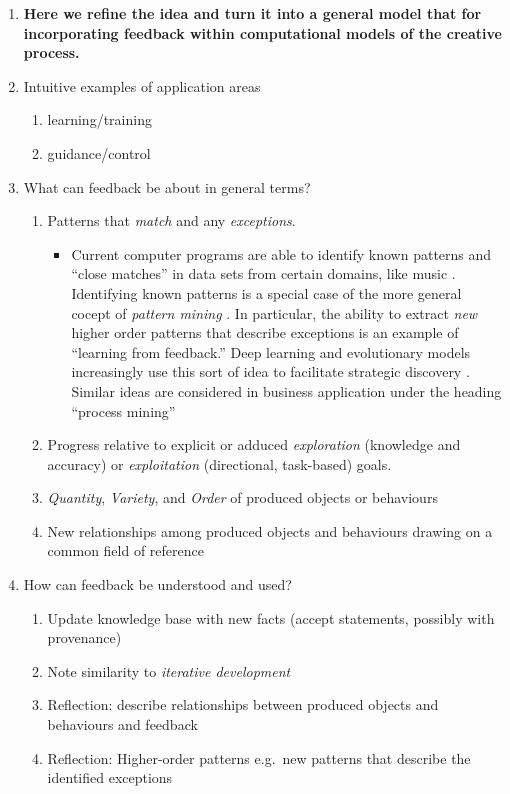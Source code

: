 \begin{enumerate}[start=2]
\item \textbf{Here we refine the idea and turn it into a general model
  that for incorporating feedback within computational models of the
  creative process.}
\item[] Intuitive examples of application areas
\begin{enumerate}
\item learning/training
\item guidance/control
\end{enumerate}
\item[] What can feedback be about in general terms? 
\begin{enumerate}
\item Patterns that \emph{match} and any \emph{exceptions}. 
\begin{itemize}
\item Current computer programs are able to identify known patterns
  and ``close matches'' in data sets from certain domains, like music
  \cite{meredith2002algorithms}.  Identifying known patterns is a
  special case of the more general cocept of \emph{pattern mining}
  \cite{bergeron2007representation}.  In particular, the ability to
  extract \emph{new} higher order patterns that describe exceptions is
  an example of ``learning from feedback.''  Deep learning and
  evolutionary models increasingly use this sort of idea to facilitate
  strategic discovery \cite{samothrakis2011approximating}.  Similar
  ideas are considered in business application under the heading
  ``process mining'' \cite{van2011process}
\end{itemize}
\item Progress relative to explicit or adduced \emph{exploration}
  (knowledge and accuracy) or \emph{exploitation} (directional,
  task-based) goals.
\item \emph{Quantity}, \emph{Variety}, and \emph{Order} of produced
  objects or behaviours
\item New relationships among produced objects and behaviours drawing
  on a common field of reference
\end{enumerate}
\item[] How can feedback be understood and used? 
\begin{enumerate}
\item Update knowledge base with new facts (accept statements,
  possibly with provenance)
\item Note similarity to \emph{iterative development}
\item Reflection: describe relationships between produced objects and
  behaviours and feedback
\item Reflection: Higher-order patterns e.g.~new patterns that
  describe the identified exceptions
\end{enumerate}
\end{enumerate}
